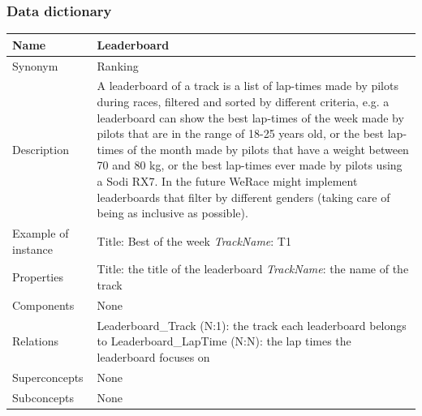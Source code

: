 \documentclass{beamer}
\newcommand{\kc}{WeRace}
\begin{document}
\begin{frame}
\frametitle{Data dictionary}
\begin{table}
\tiny
\begin{tabular}{|p{2cm}|p{6cm}|}
\hline
Name & \textbf{Leaderboard} \\
\hline
Synonym & Ranking \\
\hline
Description & A leaderboard of a track is 
a list of lap-times made by pilots during races,
filtered and sorted by different criteria, e.g. 
a leaderboard can show the best lap-times of the week
made by pilots that are in the range of 18-25 years old,
or the best lap-times of the month made by pilots that 
have a weight between 70 and 80 kg, or the best lap-times ever
made by pilots using a Sodi RX7.
In the future \kc{} might implement leaderboards that filter
by different genders (taking care of being as inclusive as possible). \\
\hline
Example of instance &
Title: Best of the week \newline
\textit{TrackName}: T1 \\
\hline
Properties &
Title: the title of the leaderboard \newline
\textit{TrackName}: the name of the track \\
\hline
Components & None \\
\hline
Relations &
Leaderboard\_Track (N:1): the track each leaderboard belongs to \newline
Leaderboard\_LapTime (N:N): the lap times the leaderboard focuses on \\
\hline
Superconcepts & None \\
\hline
Subconcepts & None \\
\hline
\end{tabular}
\end{table}
\end{frame}
\end{document}
